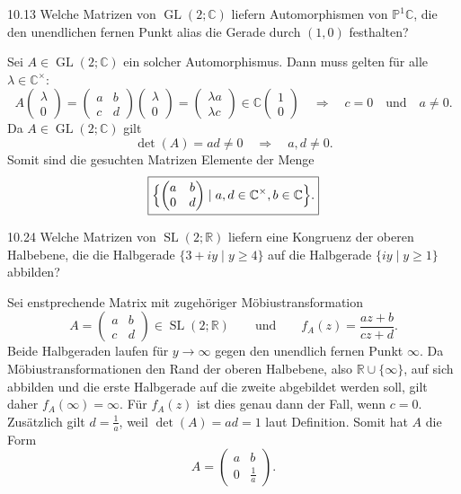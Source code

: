 \begin{exercise}{10.1}{3}
    Welche Matrizen von $\operatorname{GL}(2; \mathbb C)$ liefern Automorphismen
    von $\mathbb P^1 \mathbb C$, die den unendlichen fernen Punkt alias die Gerade
    durch $(1,0)$ festhalten?
\end{exercise}

Sei $A \in \operatorname{GL}(2;\mathbb C)$ ein solcher Automorphismus. Dann 
muss gelten für alle $\lambda \in \mathbb C^\times$:
\[
    A\begin{pmatrix} \lambda \\ 0 \end{pmatrix} =
    \begin{pmatrix}
        a & b \\
        c & d
    \end{pmatrix} \begin{pmatrix} \lambda \\ 0 \end{pmatrix}
    =
    \begin{pmatrix} \lambda a \\ \lambda c \end{pmatrix}
    \in \mathbb C \begin{pmatrix} 1 \\ 0 \end{pmatrix}
    \quad \Longrightarrow \quad c = 0 \quad \text{und} \quad a \neq 0.
\]
Da $A \in \operatorname{GL}(2;\mathbb C)$ gilt
\[
    \det(A) = ad \neq 0 \quad \Longrightarrow \quad a,d \neq 0.
\]
Somit sind die gesuchten Matrizen Elemente der Menge
\[
    \boxed{\Bigl\{
        \begin{pmatrix}
            a & b \\
            0 & d
        \end{pmatrix} \mid a,d \in \mathbb C^\times, b \in \mathbb C
    \Bigr\}.}
\]

\begin{exercise}{10.2}{4}
    Welche Matrizen von $\operatorname{SL}(2; \mathbb R)$ liefern eine Kongruenz
    der oberen Halbebene, die die Halbgerade $\{3+iy \mid y \geq 4\}$ auf die
    Halbgerade $\{iy \mid y \geq 1\}$ abbilden?
\end{exercise}

Sei enstprechende Matrix mit zugehöriger Möbiustransformation
\[
    A=
    \begin{pmatrix}
        a & b\\
        c & d
    \end{pmatrix}
    \in \operatorname{SL}(2;\mathbb R) \qquad \text{und} \qquad
    f_A(z)=\frac{az+b}{cz+d}.
\]
Beide Halbgeraden laufen für \(y\rightarrow\infty\) gegen den unendlich fernen Punkt \(\infty\).
Da Möbiustransformationen den Rand der oberen Halbebene, also $\mathbb R \cup \{\infty\}$, auf sich
abbilden und die erste Halbgerade auf die zweite abgebildet werden soll,
gilt daher \(f_A(\infty)=\infty\).
Für \(f_A(z)\) ist dies genau dann der Fall, wenn \(c=0\).
Zusätzlich gilt \(d = \frac1a\), weil \(\det(A) = ad = 1\) laut Definition.
Somit hat \(A\) die Form
\[
    A=
    \begin{pmatrix}
        a & b\\
        0 & \frac1a
    \end{pmatrix}.
\]

